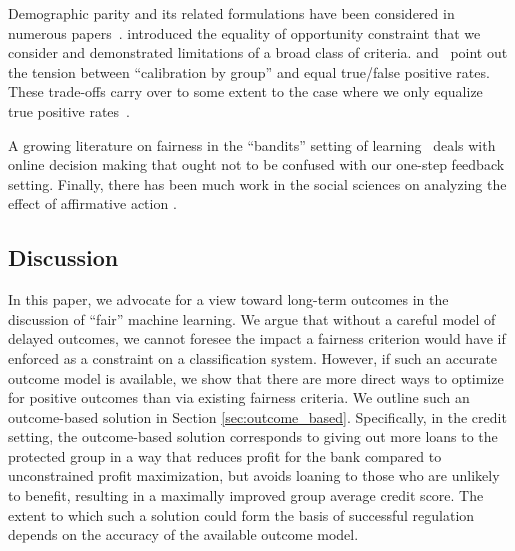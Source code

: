 Demographic parity and its related formulations have been considered in numerous
papers~\citep[e.g.][]{Calders2009,zafar17a}. \citet{hardt16equality} introduced the equality of
opportunity constraint that we consider and demonstrated limitations of a broad
class of criteria. \citet{kleinberg16inherent} and~\citet{chould16fair} point out
the tension between ``calibration by group'' and equal true/false positive
rates. These trade-offs carry over to some extent to the case where we only
equalize true positive rates~\citep{weinberger2017calibration}.

A growing literature on fairness in the ``bandits'' setting of learning~\citep[see][\emph{et sequelae}]{roth2016bandits} deals with online decision making that ought not
to be confused with our one-step feedback setting. Finally, there has been much work in the social sciences on analyzing the effect
of affirmative action \citep[see e.g.,][]{keith1985,Kaley2006}.

\subsection{Discussion}


In this paper, we advocate for a view toward long-term outcomes in the
discussion of ``fair'' machine learning. 
%
We argue that without a careful model of delayed outcomes, we cannot foresee the
impact a fairness criterion would have if enforced as a constraint on a
classification system.  However, if such an accurate outcome model is available,
we show that there are more direct ways to optimize for positive outcomes than
via existing fairness criteria. We outline such an outcome-based solution 
in Section \ref{sec:outcome_based}. Specifically, in the credit setting, the
outcome-based solution corresponds to giving out more loans to the protected
group in a way that reduces profit for the bank compared to unconstrained profit
maximization, but avoids loaning to those who are unlikely to benefit, resulting
in a maximally improved group average credit score. The extent to which such a
solution could form the basis of successful regulation depends on the accuracy
of the available outcome model.

